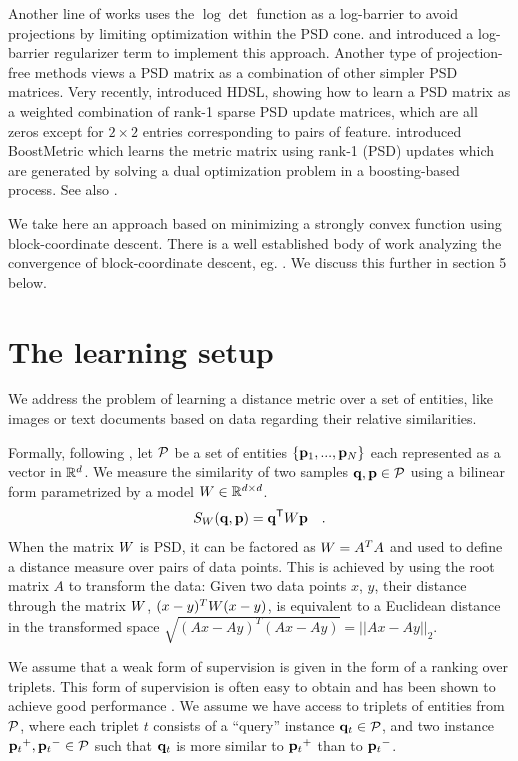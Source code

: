 \documentclass{article}
\begin{document}
Another line of works uses the $\log \det$ function as a log-barrier to avoid projections by limiting optimization within the PSD cone. \citet{davis2007information} and \citet{lego} introduced a log-barrier regularizer term to implement this approach. Another type of projection-free methods views a PSD matrix as a combination of other simpler PSD matrices. Very recently, \citet{hdsl} introduced HDSL, showing how to learn a PSD matrix as a weighted combination of rank-1 sparse PSD update matrices, which are all zeros except for $2\times2$ entries corresponding to pairs of feature. \citet{boost} introduced BoostMetric which learns the metric matrix using rank-1 (PSD) updates which are generated by solving a dual optimization problem in a boosting-based process. See also \citet{bi2011adaboost, liu2012robust}.

We take here an approach based on minimizing a strongly convex function using block-coordinate descent. There is a well established body of work analyzing the convergence of block-coordinate descent, eg. \cite{nesterov2012efficiency,richtarik2014iteration}. We discuss this further in section 5 below.


\section{The learning setup}
We address the problem of learning a distance metric over a set of
entities, like images or text documents based on data regarding their
relative similarities.

Formally, following \citet{OASIS}, let $\cal{P}$ be a set of entities
$\{{\mathbf{p}}_1,...,{\mathbf{p}}_N\}$ each represented as a vector in $\mathbb{R}^d$. We measure
the similarity of two samples ${\mathbf{q}}, {\mathbf{p}} \in \cal{P}$ using a bilinear
form parametrized by a model ${W} \in \mathbb{R}^{d \times d}$.
\begin{equation}
  S_{{W}}({\mathbf{q}}, {\mathbf{p}}) = {\mathbf{q}}{}^\mathsf{T} {W} {\mathbf{p}} \quad.
\end{equation}
When the matrix ${W}$ is PSD, it can be factored as ${W} = A^TA$ and used to define a distance measure over pairs of data points. This is achieved by using the root matrix $A$ to transform the data: Given two data points $x$, $y$, their distance through the matrix ${W}$, $(x-y)^T{W}(x-y)$, is equivalent to a Euclidean distance in the transformed space $\sqrt{(Ax-Ay)^T(Ax-Ay)} = ||Ax-Ay||_2$. 

We assume that a weak form of supervision is given in the form of a
ranking over triplets. This form of supervision is often easy
to obtain and has been shown to achieve good performance
\cite{weinberger2006dml,OASIS,qian}. We assume we have access to
triplets of entities from $\cal{P}$, where each triplet $t$ consists of
a ``query'' instance ${{\mathbf{q}}_{{t}}} \in \cal{P}$, and two instance ${{\mathbf{p}}_{{t}}}^{+}, {{\mathbf{p}}_{{t}}}^{-} \in \cal{P}$ such that ${{\mathbf{q}}_{{t}}}$ is more similar to ${{\mathbf{p}}_{{t}}}^{+}$
than to ${{\mathbf{p}}_{{t}}}^{-}$.
\end{document}

